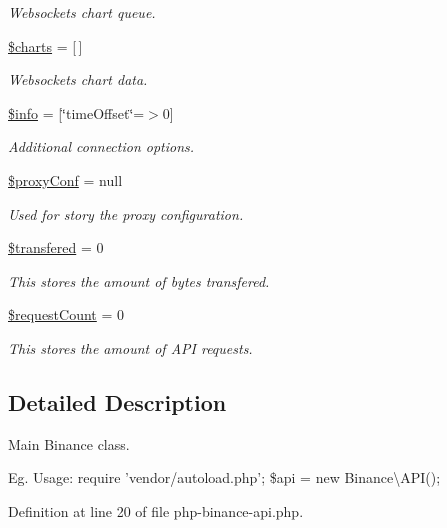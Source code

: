 \begin{DoxyCompactItemize}
\begin{DoxyCompactList}\small\item\em Websockets chart queue. \end{DoxyCompactList}\item 
\hyperlink{classBinance_1_1API_a0c2d0cd199527b3b275143c49d91702e}{\$charts} = \mbox{[}$\,$\mbox{]}
\begin{DoxyCompactList}\small\item\em Websockets chart data. \end{DoxyCompactList}\item 
\hyperlink{classBinance_1_1API_a8d15ac7cb74ac52f8f008e61aa7cab89}{\$info} = \mbox{[}\char`\"{}time\-Offset\char`\"{}=$>$0\mbox{]}
\begin{DoxyCompactList}\small\item\em Additional connection options. \end{DoxyCompactList}\item 
\hyperlink{classBinance_1_1API_a1415587257942c2b5af22c642ff58005}{\$proxy\-Conf} = null
\begin{DoxyCompactList}\small\item\em Used for story the proxy configuration. \end{DoxyCompactList}\item 
\hyperlink{classBinance_1_1API_ac40776b871ae1591348c96162e872789}{\$transfered} = 0
\begin{DoxyCompactList}\small\item\em This stores the amount of bytes transfered. \end{DoxyCompactList}\item 
\hyperlink{classBinance_1_1API_a69a4bfc5a6773dff1d01166dfbb402a2}{\$request\-Count} = 0
\begin{DoxyCompactList}\small\item\em This stores the amount of A\-P\-I requests. \end{DoxyCompactList}\end{DoxyCompactItemize}


\subsection{Detailed Description}
Main Binance class. 

Eg. Usage\-: require 'vendor/autoload.\-php'; \$api = new Binance\textbackslash{}A\-P\-I(); 

Definition at line 20 of file php-\/binance-\/api.\-php.



